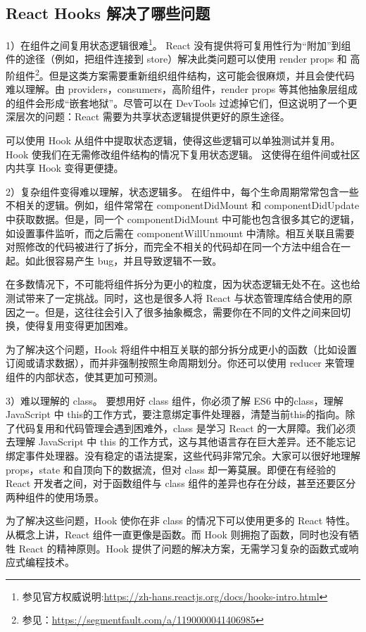 \documentclass[../../../interview-questions.tex]{subfiles}
\begin{document}
\subsection{React Hooks 解决了哪些问题}

1）在组件之间复用状态逻辑很难\footnote{参见官方权威说明:\url{https://zh-hans.reactjs.org/docs/hooks-intro.html}}。
React 没有提供将可复用性行为“附加”到组件的途径（例如，把组件连接到 store）解决此类问题可以使用 render props 和 高阶组件\footnote{参见：\url{https://segmentfault.com/a/1190000041406985}}。但是这类方案需要重新组织组件结构，这可能会很麻烦，并且会使代码难以理解。由 providers，consumers，高阶组件，render props 等其他抽象层组成的组件会形成“嵌套地狱”。尽管可以在 DevTools 过滤掉它们，但这说明了一个更深层次的问题：React 需要为共享状态逻辑提供更好的原生途径。

可以使用 Hook 从组件中提取状态逻辑，使得这些逻辑可以单独测试并复用。Hook 使我们在无需修改组件结构的情况下复用状态逻辑。 这使得在组件间或社区内共享 Hook 变得更便捷。

2）复杂组件变得难以理解，状态逻辑多。
在组件中，每个生命周期常常包含一些不相关的逻辑。例如，组件常常在 componentDidMount 和 componentDidUpdate 中获取数据。但是，同一个 componentDidMount 中可能也包含很多其它的逻辑，如设置事件监听，而之后需在 componentWillUnmount 中清除。相互关联且需要对照修改的代码被进行了拆分，而完全不相关的代码却在同一个方法中组合在一起。如此很容易产生 bug，并且导致逻辑不一致。

在多数情况下，不可能将组件拆分为更小的粒度，因为状态逻辑无处不在。这也给测试带来了一定挑战。同时，这也是很多人将 React 与状态管理库结合使用的原因之一。但是，这往往会引入了很多抽象概念，需要你在不同的文件之间来回切换，使得复用变得更加困难。

为了解决这个问题，Hook 将组件中相互关联的部分拆分成更小的函数（比如设置订阅或请求数据），而并非强制按照生命周期划分。你还可以使用 reducer 来管理组件的内部状态，使其更加可预测。

3）难以理解的 class。
要想用好 class 组件，你必须了解 ES6 中的class，理解 JavaScript 中 this的工作方式，要注意绑定事件处理器，清楚当前this的指向。除了代码复用和代码管理会遇到困难外，class 是学习 React 的一大屏障。我们必须去理解 JavaScript 中 this 的工作方式，这与其他语言存在巨大差异。还不能忘记绑定事件处理器。没有稳定的语法提案，这些代码非常冗余。大家可以很好地理解 props，state 和自顶向下的数据流，但对 class 却一筹莫展。即便在有经验的 React 开发者之间，对于函数组件与 class 组件的差异也存在分歧，甚至还要区分两种组件的使用场景。

为了解决这些问题，Hook 使你在非 class 的情况下可以使用更多的 React 特性。 从概念上讲，React 组件一直更像是函数。而 Hook 则拥抱了函数，同时也没有牺牲 React 的精神原则。Hook 提供了问题的解决方案，无需学习复杂的函数式或响应式编程技术。
\end{document}
